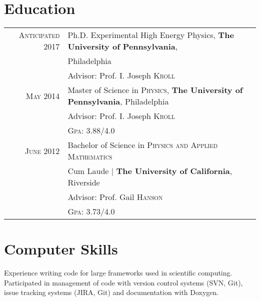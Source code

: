 \documentclass[a4paper,10pt]{article} %
\begin{document}
\section{Education}

\begin{tabular}{rl}
\textsc{Anticipated 2017} & Ph.D. Experimental High Energy Physics, \textbf{The University of Pennsylvania}, \\
                          & Philadelphia \\
&\small Advisor: Prof. I. Joseph \textsc{Kroll}\\
\vspace{1mm}


\textsc{May} 2014 & Master of Science in \textsc{Physics}, \textbf{The University of Pennsylvania}, Philadelphia\\
&\small Advisor: Prof. I. Joseph \textsc{Kroll}\\
&\normalsize \textsc{Gpa}: 3.88/4.0\\
\vspace{1mm}


\textsc{June} 2012& Bachelor of Science in \textsc{}\textsc{Physics and Applied Mathematics} \\
&Cum Laude | \normalsize\textbf{The University of California}, Riverside\\
&\small Advisor: Prof. Gail \textsc{Hanson}\\
&\normalsize \textsc{Gpa}: 3.73/4.0 \\

\end{tabular}
\vspace{0mm}


\section{Computer Skills}

Experience writing code for large frameworks used in scientific computing. Participated
in management of code with version control systems (SVN, Git), issue tracking systems (JIRA, Git)
and documentation with Doxygen.
\end{document}
